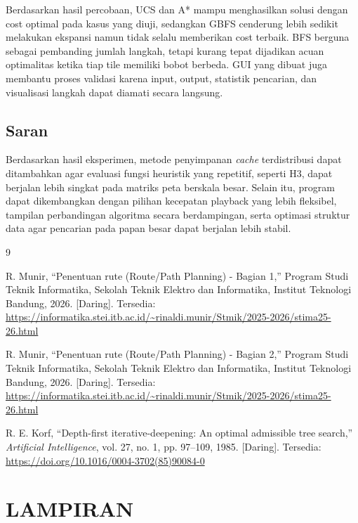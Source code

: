 \documentclass[11pt,a4paper]{article}
\begin{document}
Berdasarkan hasil percobaan, UCS dan A* mampu menghasilkan solusi dengan cost optimal pada kasus yang diuji, sedangkan GBFS cenderung lebih sedikit melakukan ekspansi namun tidak selalu memberikan cost terbaik. BFS berguna sebagai pembanding jumlah langkah, tetapi kurang tepat dijadikan acuan optimalitas ketika tiap tile memiliki bobot berbeda. GUI yang dibuat juga membantu proses validasi karena input, output, statistik pencarian, dan visualisasi langkah dapat diamati secara langsung.

\subsection{Saran}
Berdasarkan hasil eksperimen, metode penyimpanan \textit{cache} terdistribusi dapat ditambahkan agar evaluasi fungsi heuristik yang repetitif, seperti H3, dapat berjalan lebih singkat pada matriks peta berskala besar. Selain itu, program dapat dikembangkan dengan pilihan kecepatan playback yang lebih fleksibel, tampilan perbandingan algoritma secara berdampingan, serta optimasi struktur data agar pencarian pada papan besar dapat berjalan lebih stabil.

\newpage
\renewcommand{\refname}{DAFTAR PUSTAKA}
\begin{thebibliography}{9}

R. Munir, ``Penentuan rute (Route/Path Planning) - Bagian 1,'' Program Studi Teknik Informatika, Sekolah Teknik Elektro dan Informatika, Institut Teknologi Bandung, 2026. [Daring]. Tersedia: \url{https://informatika.stei.itb.ac.id/~rinaldi.munir/Stmik/2025-2026/stima25-26.html}

R. Munir, ``Penentuan rute (Route/Path Planning) - Bagian 2,'' Program Studi Teknik Informatika, Sekolah Teknik Elektro dan Informatika, Institut Teknologi Bandung, 2026. [Daring]. Tersedia: \url{https://informatika.stei.itb.ac.id/~rinaldi.munir/Stmik/2025-2026/stima25-26.html}

R. E. Korf, ``Depth-first iterative-deepening: An optimal admissible tree search,'' \textit{Artificial Intelligence}, vol. 27, no. 1, pp. 97--109, 1985. [Daring]. Tersedia: \url{https://doi.org/10.1016/0004-3702(85)90084-0}

\end{thebibliography}

\newpage
\section*{LAMPIRAN}
\end{document}
